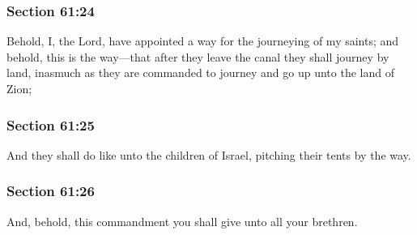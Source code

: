 	\subsubsection{Section 61:24} %
		\label{DC61-24}

		Behold, I, the Lord, have appointed a way for the journeying of my saints; and behold, this is the way---that after they leave the canal they shall journey by land, inasmuch as they are commanded to journey and go up unto the land of Zion;


	\subsubsection{Section 61:25} %
		\label{DC61-25}

		And they shall do like unto the children of Israel, pitching their tents by the way.


	\subsubsection{Section 61:26} %
		\label{DC61-26}

		And, behold, this commandment you shall give unto all your brethren.


